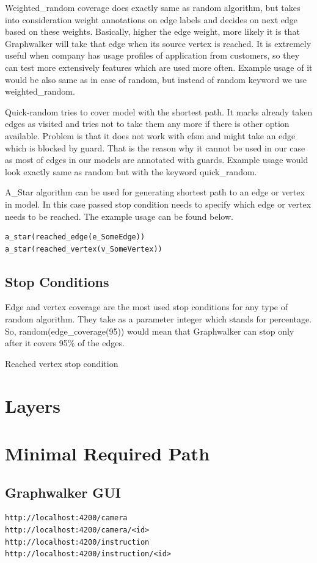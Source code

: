 \par
Weighted\_random coverage does exactly same as random algorithm, but takes into consideration weight annotations on edge labels and decides on next edge based on these weights. Basically, higher the edge weight, more likely it is that Graphwalker will take that edge when its source vertex is reached. It is extremely useful when company has usage profiles of application from customers, so they can test more extensively features which are used more often. Example usage of it would be also same as in case of random, but instead of random keyword we use weighted\_random.

\par
Quick-random tries to cover model with the shortest path. It marks already taken edges 
as visited and tries not to take them any more if there is other option available. Problem is that it does not work with \acrshort{efsm} and might take an edge which is blocked by guard. That is the reason why it cannot be used in our case as most of edges in our models are annotated with guards. Example usage would look exactly same as random but with the keyword quick\_random.

\par
A\_Star algorithm can be used for generating shortest path to an edge or vertex in model. In this case passed stop condition needs to specify which edge or vertex needs to be reached. The example usage can be found below.

\begin{lstlisting}
a_star(reached_edge(e_SomeEdge))
a_star(reached_vertex(v_SomeVertex))
\end{lstlisting}

\subsection{Stop Conditions}
\par
Edge and vertex coverage are the most used stop conditions for any type of random algorithm. They take as a parameter integer which stands for percentage. So, random(edge\_coverage(95)) would mean that Graphwalker can stop only after it covers 95\% of the edges.

\par
Reached vertex stop condition

\section{Layers}
\section{Minimal Required Path}
\subsection{Graphwalker GUI} 


\begin{lstlisting}
http://localhost:4200/camera
http://localhost:4200/camera/<id>
http://localhost:4200/instruction
http://localhost:4200/instruction/<id>
\end{lstlisting}